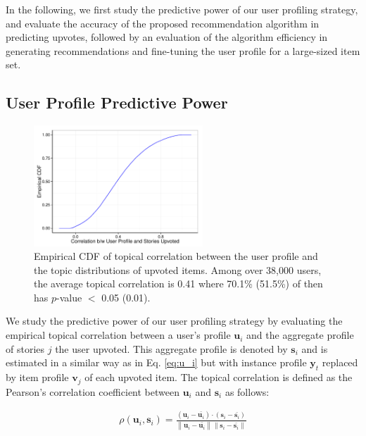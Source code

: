 \documentclass[conference]{IEEEtran}
\begin{document}

In the following, we first study the predictive power of our user profiling strategy, and evaluate the accuracy of the proposed recommendation algorithm in predicting upvotes, followed by an evaluation of the algorithm efficiency in generating recommendations and fine-tuning the user profile for a large-sized item set.

\subsection{User Profile Predictive Power}
\begin{figure}[!t]
\centering
\includegraphics[width=2.5in]{images/profile-corr}
\caption{Empirical CDF of topical correlation between the user profile and the topic distributions of upvoted items. Among over 38,000 users, the average topical correlation is 0.41 where 70.1\% (51.5\%) of then has $p$-value $<$ 0.05 (0.01).}
\label{fig:corr}
\end{figure}
We study the predictive power of our user profiling strategy by evaluating the empirical topical correlation between a user's profile $\mathbf{u}_i$ and the aggregate profile of stories $j$ the user upvoted. This aggregate profile is denoted by $\mathbf{s}_i$ and is estimated in a similar way as in Eq. \ref{eq:u_i} but with instance profile $\mathbf{y}_t$ replaced by item profile $\mathbf{v}_j$ of each upvoted item. The topical correlation is defined as the Pearson's correlation coefficient between $\mathbf{u}_i$ and $\mathbf{s}_i$ as follows:

\begin{eqnarray}
 \rho(\mathbf{u}_i,\mathbf{s}_i) = \frac {(\mathbf{u}_i -  \bar{\mathbf{u}_i}) \cdot (\mathbf{s}_i - \bar{\mathbf{s}_i}) } { \left\| \mathbf{u}_i -  \bar{\mathbf{u}_i} \right\| \left\| \mathbf{s}_i - \bar{\mathbf{s}_i}\right\| } 
\end{eqnarray}
\end{document}
